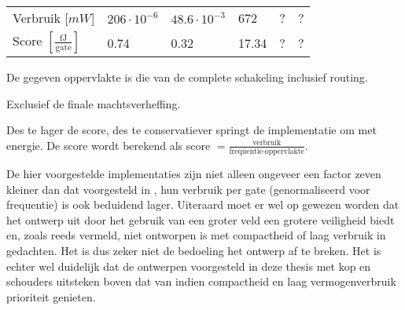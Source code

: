 \begin{table}[h]
\begin{narrow}{-2cm}{-2cm}
\begin{tabular}{llllll}
			Verbruik [$mW$]																& $206 \cdot 10^{-6}$		& $48.6 \cdot 10^{-3}$		& 672							& ?								& ?\\
			Score $\left[ \frac{\text{fJ}}{\text{gate}} \right]$\footnotemark[4]	& 0.74					& 0.32							& 17.34						& ?								& ?\\
			\bottomrule		
		\end{tabular}
	\end{narrow}
	
	\footnotesize \footnotemark[2] De gegeven oppervlakte is die van de complete schakeling inclusief routing.
	
	\footnotemark[3] Exclusief de finale machtsverheffing.
	
	\footnotemark[4] Des te lager de score, des te conservatiever springt de implementatie om met energie. De score wordt berekend als score $= \frac{\text{verbruik}}{\text{frequentie} \cdot \text{oppervlakte}}$. 
\end{table}

De hier voorgestelde implementaties zijn niet alleen ongeveer een factor zeven kleiner dan dat voorgesteld in \cite{beuchat-asic}, hun verbruik per gate (genormaliseerd voor frequentie) is ook beduidend lager. Uiteraard moet er wel op gewezen worden dat het ontwerp uit \cite{beuchat-asic} door het gebruik van een groter veld een grotere veiligheid biedt en, zoals reeds vermeld, niet ontworpen is met compactheid of laag verbruik in gedachten. Het is dus zeker niet de bedoeling het ontwerp af te breken. Het is echter wel duidelijk dat de ontwerpen voorgesteld in deze thesis met kop en schouders uitsteken boven dat van \cite{beuchat-asic} indien compactheid en laag vermogenverbruik prioriteit genieten.
